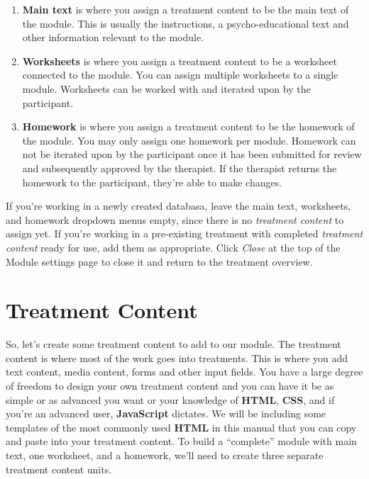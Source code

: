 \documentclass[]{book}
\providecommand{\tightlist}{%
  \setlength{\itemsep}{0pt}\setlength{\parskip}{0pt}}
\begin{document}
\begin{enumerate}
\def\labelenumi{\arabic{enumi}.}
\tightlist
\item
  \textbf{Main text} is where you assign a treatment content to be the main text of the module. This is usually the instructions, a psycho-educational text and other information relevant to the module.
\item
  \textbf{Worksheets} is where you assign a treatment content to be a worksheet connected to the module. You can assign multiple worksheets to a single module. Worksheets can be worked with and iterated upon by the participant.
\item
  \textbf{Homework} is where you assign a treatment content to be the homework of the module. You may only assign one homework per module. Homework can not be iterated upon by the participant once it has been submitted for review and subsequently approved by the therapist. If the therapist returns the homework to the participant, they're able to make changes.
\end{enumerate}

If you're working in a newly created databasa, leave the main text, worksheets, and homework dropdown menus empty, since there is no \emph{treatment content} to assign yet.
If you're working in a pre-existing treatment with completed \emph{treatment content} ready for use, add them as appropriate.
Click \emph{Close} at the top of the Module settings page to close it and return to the treatment overview.

\hypertarget{treatment-content}{%
\section{Treatment Content}\label{treatment-content}}

So, let's create some treatment content to add to our module. The treatment content is where most of the work goes into treatments. This is where you add text content, media content, forms and other input fields. You have a large degree of freedom to design your own treatment content and you can have it be as simple or as advanced you want or your knowledge of \textbf{HTML}, \textbf{CSS}, and if you're an advanced user, \textbf{JavaScript} dictates. We will be including some templates of the most commonly used \textbf{HTML} in this manual that you can copy and paste into your treatment content. To build a ``complete'' module with main text, one worksheet, and a homework, we'll need to create three separate treatment content units.
\end{document}
